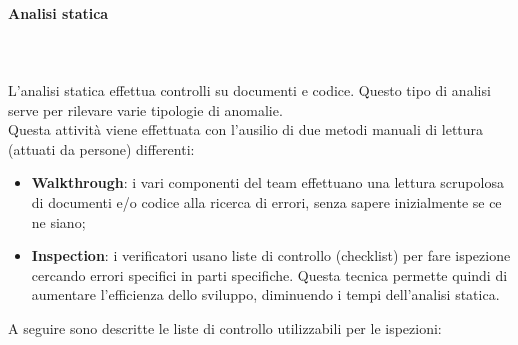 \paragraph{Analisi statica} \mbox{} \\ \mbox{} \\
L'analisi statica effettua controlli su documenti e codice. Questo tipo di analisi serve per rilevare varie tipologie di anomalie. \\
Questa attività viene effettuata con l'ausilio di due metodi manuali di lettura (attuati da persone) differenti: \begin{itemize}
\item \textbf{Walkthrough}: i vari componenti del team effettuano una lettura scrupolosa di documenti e/o codice alla ricerca di errori, senza sapere inizialmente se ce ne siano;
\item \textbf{Inspection}: i verificatori usano liste di controllo (checklist) per fare ispezione cercando errori specifici in parti specifiche. Questa tecnica permette quindi di aumentare l'efficienza dello sviluppo, diminuendo i tempi dell'analisi statica.
\end{itemize}
A seguire sono descritte le liste di controllo utilizzabili per le ispezioni:
